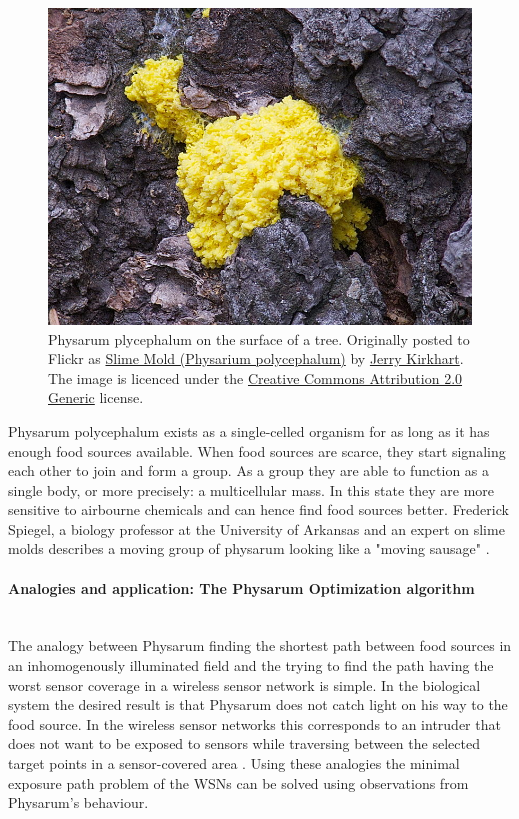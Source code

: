 \documentclass[cameraready]{IWORK2014}
\begin{document}
\begin{figure}
    \centering
    \includegraphics[width=0.8\linewidth]{physarum.jpg}
    \caption{Physarum plycephalum on the surface of a tree.
{\tiny Originally posted to Flickr as \href{http://flickr.com/photos/33466410@N00/4988821189}{Slime Mold (Physarium polycephalum)} by \href{http://flickr.com/people/33466410@N00}{Jerry Kirkhart}. The image is licenced under the \href{http://creativecommons.org/licenses/by/2.0/deed.en}{Creative Commons Attribution 2.0 Generic} license.}}
    \label{fig:physarum}
\end{figure}

Physarum polycephalum exists as a single-celled organism for as long as it has enough food sources available. When food sources are scarce, they start signaling each other to join and form a group. As a group they are able to function as a single body, or more precisely: a multicellular mass. In this state they are more sensitive to airbourne chemicals and can hence find food sources better. Frederick Spiegel, a biology professor at the University of Arkansas and an expert on slime molds describes a moving group of physarum looking like a "moving sausage" \cite{spiegel2012slimemold}.

\paragraph{Analogies and application: The Physarum Optimization algorithm}~\\
The analogy between Physarum finding the shortest path between food sources in an inhomogenously illuminated field and the trying to find the path having the worst sensor coverage in a wireless sensor network is simple. In the biological system the desired result is that Physarum does not catch light on his way to the food source. In the wireless sensor networks this corresponds to an intruder that does not want to be exposed to sensors while traversing between the selected target points in a sensor-covered area \cite{liu2012physarum}. Using these analogies the minimal exposure path problem of the WSNs can be solved using observations from Physarum's behaviour.
\end{document}
